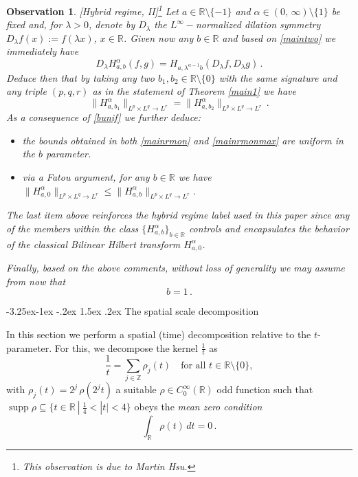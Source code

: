 \documentclass[a4paper,reqno]{amsart}
\makeatletter
\def\subsection{\@startsection{subsection}{2}{\z@}%
	{-3.25ex\@plus -1ex \@minus -.2ex}%
	{1.5ex \@plus .2ex}%
	{\normalfont\bfseries\boldmath}}
\numberwithin{equation}{section}
\newtheorem{observation}[theorem]{Observation}
\theoremstyle{definition}
\newcommand{\R}{\mathbb{R}}
\newcommand{\Z}{\mathbb{Z}}
\def\a{\alpha}
\def\l{\lambda}
\DeclareMathOperator{\supp}{supp}
\makeatother
\begin{document}
\begin{observation}\label{Unifb}[\textsf{Hybrid regime}, II]\footnote{This observation is due to Martin Hsu.} Let $a\in\R\setminus\{-1\}$ and $\a\in(0,\,\infty)\setminus\{1\}$ be fixed and, for $\l>0$, denote by $D_{\l}$ the $L^{\infty}-$normalized dilation symmetry $D_{\l}f(x):=f(\l x)$, $x\in\R$. Given now any $b\in\R$ and based on \eqref{maintwo} we immediately have
\begin{equation}\label{dillambda}
		D_{\l} H_{a,b}^\a(f,g)= H_{a, \l^{\a-1} b} (D_{\l} f, D_{\l} g)\,.
\end{equation}
Deduce then that by taking any two $b_1, b_2\in \R\setminus\{0\}$ with the same signature and any triple $(p,q,r)$ as in the statement of Theorem \ref{main1} we have
\begin{equation}\label{bunif}
		\|H_{a,b_1}^\a\|_{L^{p}\times L^{q}\rightarrow L^{r}}=\|H_{a,b_2}^\a\|_{L^{p}\times L^{q}\rightarrow L^{r}}\,.
\end{equation}
As a consequence of \eqref{bunif} we further deduce:
\begin{itemize}
\item the bounds obtained in both \eqref{mainrmon} and \eqref{mainrmonmax} are \emph{uniform} in the $b$ parameter.

\item via a Fatou argument, for any $b\in\R$ we have $\|H_{a,0}^\a\|_{L^{p}\times L^{q}\rightarrow L^{r}}\leq \|H_{a,b}^\a\|_{L^{p}\times L^{q}\rightarrow L^{r}}$.
\end{itemize}
The last item above reinforces the hybrid regime label used in this paper since any of the members within the class $\{H_{a,b}^\a\}_{b\in \R}$ controls and encapsulates the behavior of the classical Bilinear Hilbert transform $H_{a,0}^\a$.

Finally, based on the above comments, without loss of generality we may assume from now that
$$b=1\,.$$
\end{observation}

\subsection{The spatial scale decomposition}

In this section we perform a spatial (time) decomposition relative to the $t$-parameter. For this,
we decompose the kernel $\frac{1}{t}$ as
\begin{equation}\label{1overt}
	\frac{1}{t}=\sum_{j\in\Z}\rho_j(t) \quad \text{for all } t\in\R\setminus\{0\},
\end{equation}
with $\rho_j(t)=2^j\,\rho(2^j t)$ a suitable $\rho\in C^\infty_0(\R)$ odd function such that $\supp\rho\subseteq\{t\in\R\:|\:\frac{1}{4}<|t|<4\}$ obeys the \emph{mean zero condition}
\begin{equation}\label{mean-zero}
	\int_{\R}\rho(t)\,dt=0\,.
\end{equation}
\end{document}
